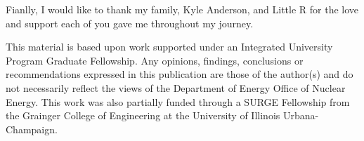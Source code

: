 Fianlly, I would like to thank my family, Kyle Anderson, and Little R
for the love and support each of you gave me throughout my journey. 

This material is based upon work supported under an Integrated University 
Program Graduate Fellowship. Any opinions, findings, conclusions or 
recommendations expressed in this publication are those of the author(s) 
and do not necessarily reflect the views of the Department of Energy Office 
of Nuclear Energy. This work was also partially funded through a SURGE 
Fellowship from the Grainger College of Engineering at the University of 
Illinois Urbana-Champaign.